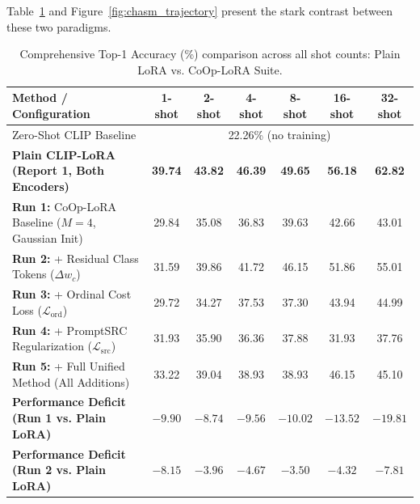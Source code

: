 \documentclass[letterpaper,11pt,leqno]{article}
\begin{document}
Table~\ref{tab:empirical_chasm} and Figure~\ref{fig:chasm_trajectory} present the stark contrast between these two paradigms.

\begin{table}[H]
\centering
\caption{Comprehensive Top-1 Accuracy (\%) comparison across all shot counts: Plain LoRA vs. CoOp-LoRA Suite.}
\label{tab:empirical_chasm}
\small
\begin{tabular}{lcccccc}
\toprule
\textbf{Method / Configuration} & \textbf{1-shot} & \textbf{2-shot} & \textbf{4-shot} & \textbf{8-shot} & \textbf{16-shot} & \textbf{32-shot} \\
\midrule
Zero-Shot CLIP Baseline & \multicolumn{6}{c}{22.26\% (no training)} \\
\midrule
\textbf{Plain CLIP-LoRA (Report 1, Both Encoders)} & \cellcolor{bestgreen}\textbf{39.74} & \cellcolor{bestgreen}\textbf{43.82} & \cellcolor{bestgreen}\textbf{46.39} & \cellcolor{bestgreen}\textbf{49.65} & \cellcolor{bestgreen}\textbf{56.18} & \cellcolor{bestgreen}\textbf{62.82} \\
\midrule
\textbf{Run 1:} CoOp-LoRA Baseline ($M{=}4$, Gaussian Init) & 29.84 & 35.08 & 36.83 & 39.63 & 42.66 & 43.01 \\
\textbf{Run 2:} + Residual Class Tokens ($\Delta w_c$) & 31.59 & \cellcolor{sectionblue}39.86 & \cellcolor{sectionblue}41.72 & \cellcolor{sectionblue}46.15 & \cellcolor{sectionblue}51.86 & \cellcolor{sectionblue}55.01 \\
\textbf{Run 3:} + Ordinal Cost Loss ($\mathcal{L}_\mathrm{ord}$) & 29.72 & 34.27 & 37.53 & 37.30 & 43.94 & 44.99 \\
\textbf{Run 4:} + PromptSRC Regularization ($\mathcal{L}_\mathrm{src}$) & 31.93 & 35.90 & 36.36 & 37.88 & \cellcolor{worstred}31.93 & 37.76 \\
\textbf{Run 5:} + Full Unified Method (All Additions) & \cellcolor{sectionblue}33.22 & 39.04 & 38.93 & 38.93 & 46.15 & 45.10 \\
\midrule
\textbf{Performance Deficit (Run 1 vs. Plain LoRA)} & \color{red}$-9.90$ & \color{red}$-8.74$ & \color{red}$-9.56$ & \color{red}$-10.02$ & \color{red}$-13.52$ & \color{red}$-19.81$ \\
\textbf{Performance Deficit (Run 2 vs. Plain LoRA)} & \color{red}$-8.15$ & \color{red}$-3.96$ & \color{red}$-4.67$ & \color{red}$-3.50$ & \color{red}$-4.32$ & \color{red}$-7.81$ \\
\bottomrule
\end{tabular}
\end{table}
\end{document}
